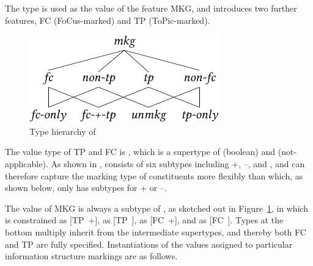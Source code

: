 The type  is used as the value of the feature MKG, and
introduces two further features, FC (FoCus-marked) and TP
(ToPic-marked).


\begin{figure}[!t]
\begin{center} 
\includegraphics{pdf/hmkg.pdf}
\caption{Type hierarchy of }
\label{fig:mkg}
\end{center}
\end{figure}



\noindent The value type of TP and FC is , which is a
supertype of  (boolean) and  (not-applicable).  As
shown in ,  consists of six subtypes including
+, --, and , and can therefore capture the marking type of
constituents more flexibly than  which, as shown below, only
has subtypes for + or --.




\noindent The value of MKG is always a subtype of ,
as sketched out in Figure~\ref{fig:mkg}, in which
 is constrained as \mbox{[TP +]},  as
\mbox{[TP ]},  as \mbox{[FC +]}, and
 as \mbox{[FC ]}. Types at the bottom
multiply inherit from the intermediate supertypes, and thereby both FC
and TP are fully specified.  Instantiations of the  values
assigned to particular information structure markings are as follows.



